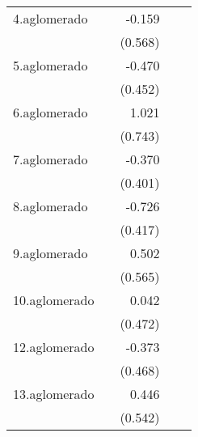 {\begin{longtable}{l*{4}{D{.}{.}{-1}}}
\addlinespace
4.aglomerado&                     &      -0.159         &                     &                     \\
            &                     &     (0.568)         &                     &                     \\
\addlinespace
5.aglomerado&                     &      -0.470         &                     &                     \\
            &                     &     (0.452)         &                     &                     \\
\addlinespace
6.aglomerado&                     &       1.021         &                     &                     \\
            &                     &     (0.743)         &                     &                     \\
\addlinespace
7.aglomerado&                     &      -0.370         &                     &                     \\
            &                     &     (0.401)         &                     &                     \\
\addlinespace
8.aglomerado&                     &      -0.726         &                     &                     \\
            &                     &     (0.417)         &                     &                     \\
\addlinespace
9.aglomerado&                     &       0.502         &                     &                     \\
            &                     &     (0.565)         &                     &                     \\
\addlinespace
10.aglomerado&                     &       0.042         &                     &                     \\
            &                     &     (0.472)         &                     &                     \\
\addlinespace
12.aglomerado&                     &      -0.373         &                     &                     \\
            &                     &     (0.468)         &                     &                     \\
\addlinespace
13.aglomerado&                     &       0.446         &                     &                     \\
            &                     &     (0.542)         &                     &                     \\

\end{longtable}}
